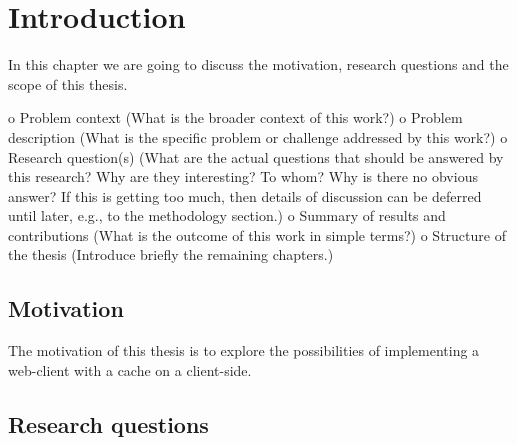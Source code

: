 \chapter{Introduction}
\label{Introduction}

In this chapter we are going to discuss the motivation, research questions and the scope of this thesis.

o Problem context (What is the broader context of this work?) 
o Problem description (What is the specific problem or challenge addressed by this work?) 
o Research question(s) (What are the actual questions that should be answered by this research? Why are they interesting? To whom? Why is there no obvious answer? If this is getting too much, then details of discussion can be deferred until later, e.g., to the methodology section.) 
o Summary of results and contributions (What is the outcome of this work in simple terms?) 
o Structure of the thesis (Introduce briefly the remaining chapters.)

\section{Motivation}

The motivation of this thesis is to explore the possibilities of implementing a web-client with a cache on a client-side. 

\section{Research questions}